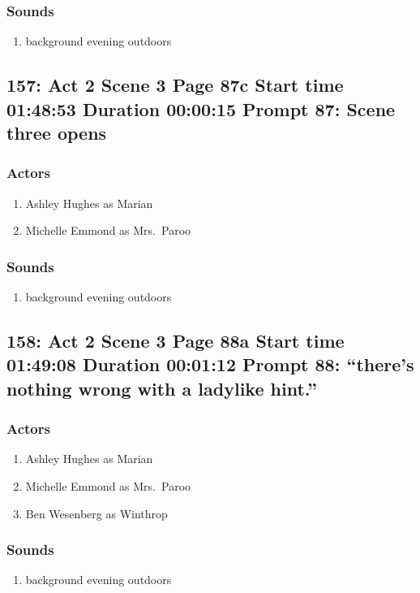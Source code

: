\subsubsection{Sounds}
\begin{enumerate}
\item background evening outdoors
\end{enumerate}
\subsection{157: Act 2 Scene 3 Page 87c Start time 01:48:53 Duration 00:00:15 Prompt 87: Scene three opens}

\subsubsection{Actors}
\begin{enumerate}
\item Ashley Hughes as Marian
\item Michelle Emmond as Mrs.~Paroo
\end{enumerate}

\subsubsection{Sounds}
\begin{enumerate}
\item background evening outdoors
\end{enumerate}
\subsection{158: Act 2 Scene 3 Page 88a Start time 01:49:08 Duration 00:01:12 Prompt 88: ``there's nothing wrong with a ladylike hint.''}

\subsubsection{Actors}
\begin{enumerate}
\item Ashley Hughes as Marian
\item Michelle Emmond as Mrs.~Paroo
\item Ben Wesenberg as Winthrop
\end{enumerate}

\subsubsection{Sounds}
\begin{enumerate}
\item background evening outdoors
\end{enumerate}

